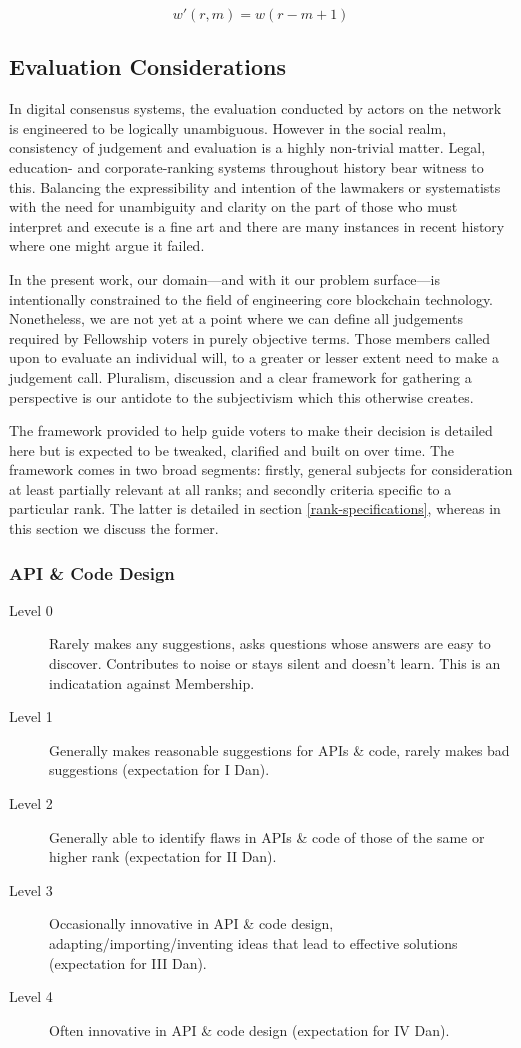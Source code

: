 \documentclass[9pt,oneside]{amsart}
\begin{document}
\begin{equation}
  w'(r, m) = w(r - m + 1)
\end{equation}

\subsection{Evaluation Considerations}

In digital consensus systems, the evaluation conducted by actors on the network is engineered to be logically unambiguous. However in the social realm, consistency of judgement and evaluation is a highly non-trivial matter. Legal, education- and corporate-ranking systems throughout history bear witness to this. Balancing the expressibility and intention of the lawmakers or systematists with the need for unambiguity and clarity on the part of those who must interpret and execute is a fine art and there are many instances in recent history where one might argue it failed.

In the present work, our domain---and with it our problem surface---is intentionally constrained to the field of engineering core blockchain technology. Nonetheless, we are not yet at a point where we can define all judgements required by Fellowship voters in purely objective terms. Those members called upon to evaluate an individual will, to a greater or lesser extent need to make a judgement call. Pluralism, discussion and a clear framework for gathering a perspective is our antidote to the subjectivism which this otherwise creates.

The framework provided to help guide voters to make their decision is detailed here but is expected to be tweaked, clarified and built on over time. The framework comes in two broad segments: firstly, general subjects for consideration at least partially relevant at all ranks; and secondly criteria specific to a particular rank. The latter is detailed in section \ref{rank-specifications}, whereas in this section we discuss the former.

\subsubsection{API \& Code Design}

\begin{description}
  \item[Level 0] Rarely makes any suggestions, asks questions whose answers are easy to discover. Contributes to noise or stays silent and doesn't learn. This is an indicatation against Membership.
  \item[Level 1] Generally makes reasonable suggestions for APIs \& code, rarely makes bad suggestions (expectation for I Dan).
  \item[Level 2] Generally able to identify flaws in APIs \& code of those of the same or higher rank (expectation for II Dan).
  \item[Level 3] Occasionally innovative in API \& code design, adapting/importing/inventing ideas that lead to effective solutions (expectation for III Dan).
  \item[Level 4] Often innovative in API \& code design (expectation for IV Dan).
\end{description}
\end{document}
